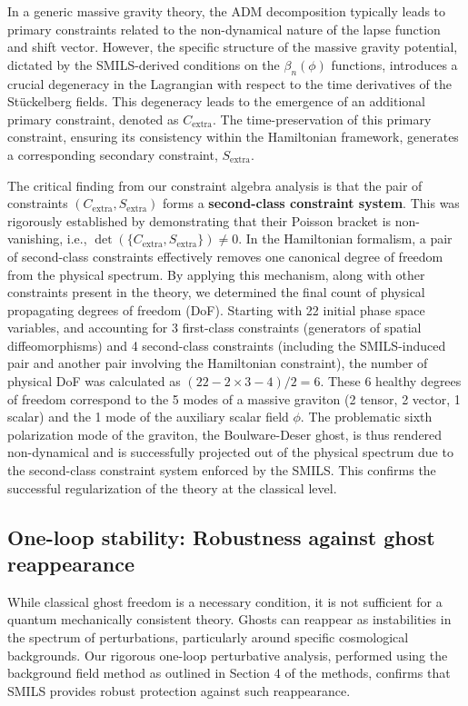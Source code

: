 \documentclass[twocolumn]{aastex631}
\begin{document}
In a generic massive gravity theory, the ADM decomposition typically leads to primary constraints related to the non-dynamical nature of the lapse function and shift vector. However, the specific structure of the massive gravity potential, dictated by the SMILS-derived conditions on the $\beta_n(\phi)$ functions, introduces a crucial degeneracy in the Lagrangian with respect to the time derivatives of the Stückelberg fields. This degeneracy leads to the emergence of an additional primary constraint, denoted as $C_{\text{extra}}$. The time-preservation of this primary constraint, ensuring its consistency within the Hamiltonian framework, generates a corresponding secondary constraint, $S_{\text{extra}}$.

The critical finding from our constraint algebra analysis is that the pair of constraints $(C_{\text{extra}}, S_{\text{extra}})$ forms a \textbf{second-class constraint system}. This was rigorously established by demonstrating that their Poisson bracket is non-vanishing, i.e., $\det(\{C_{\text{extra}}, S_{\text{extra}}\}) \neq 0$. In the Hamiltonian formalism, a pair of second-class constraints effectively removes one canonical degree of freedom from the physical spectrum. By applying this mechanism, along with other constraints present in the theory, we determined the final count of physical propagating degrees of freedom (DoF). Starting with 22 initial phase space variables, and accounting for 3 first-class constraints (generators of spatial diffeomorphisms) and 4 second-class constraints (including the SMILS-induced pair and another pair involving the Hamiltonian constraint), the number of physical DoF was calculated as $(22 - 2 \times 3 - 4) / 2 = 6$. These 6 healthy degrees of freedom correspond to the 5 modes of a massive graviton (2 tensor, 2 vector, 1 scalar) and the 1 mode of the auxiliary scalar field $\phi$. The problematic sixth polarization mode of the graviton, the Boulware-Deser ghost, is thus rendered non-dynamical and is successfully projected out of the physical spectrum due to the second-class constraint system enforced by the SMILS. This confirms the successful regularization of the theory at the classical level.

\subsection{One-loop stability: Robustness against ghost reappearance}
While classical ghost freedom is a necessary condition, it is not sufficient for a quantum mechanically consistent theory. Ghosts can reappear as instabilities in the spectrum of perturbations, particularly around specific cosmological backgrounds. Our rigorous one-loop perturbative analysis, performed using the background field method as outlined in Section 4 of the methods, confirms that SMILS provides robust protection against such reappearance.
\end{document}
